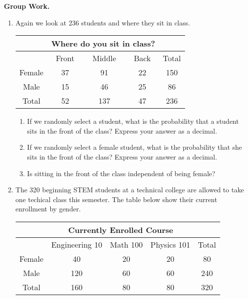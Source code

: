 \textbf{Group Work.} 
\begin{enumerate}
\item Again we look at 236 students and where they sit in class. 
\begin{table}[h]
\centering
\begin{tabular}{|c|c|c|c|c|}\hline
&\multicolumn{3}{|c|}{Where do you sit in class?}&\\
\hline
&Front&Middle&Back&Total\\
\hline
Female&37&91&22&150\\
\hline
Male&15&46&25&86\\
\hline
Total&52&137&47&236\\
\hline
\end{tabular}
\end{table}

\begin{enumerate}
\item If we randomly select a student, what is the probability that a student sits in the front of the class? Express your answer as a decimal. \\[.4cm]
\item If we randomly select a female student, what is the probability that she sits in the front of the class? Express your answer as a decimal.\\[.4cm]
\item Is sitting in the front of the class independent of being female?\\[.4cm]
\end{enumerate}
\newpage
\item The 320 beginning STEM students at a technical college are allowed to take one techical class this semester. The table below show their current enrollment by gender.

\begin{table}[h]
\centering
\begin{tabular}{|c|c|c|c|c|}\hline
&\multicolumn{3}{|c|}{Currently Enrolled Course}&\\
\hline
&Engineering 10&Math 100&Physics 101&Total\\
\hline
Female&40&20&20&80\\
\hline
Male&120&60&60&240\\
\hline
Total&160&80&80&320\\
\hline
\end{tabular}
\end{table}


\end{enumerate}
